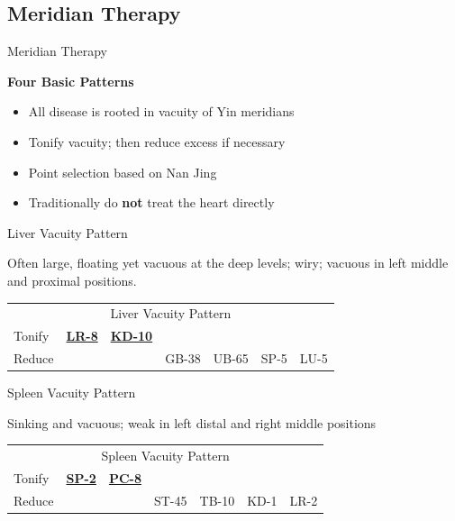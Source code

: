 \subsection{Meridian Therapy}

\begin{frame}{Meridian Therapy}

\textbf{\Large Four Basic Patterns}

\begin{itemize}\itemsep1em
\item All disease is rooted in vacuity of Yin meridians
\item Tonify vacuity; then reduce excess if necessary
\item Point selection based on Nan Jing
\item Traditionally do \textbf{not} treat the heart directly
\end{itemize}

\end{frame}

\begin{frame}{Liver Vacuity Pattern}

\begin{pulse}
Often large, floating yet vacuous at the deep levels; wiry; vacuous in left middle and proximal positions.
\end{pulse}


\begin{table}[]
\begin{tabular}{lllllll}
\multicolumn{7}{c}{Liver Vacuity Pattern}                                         \\
Tonify & {\ul \textbf{LR-8}} & {\ul \textbf{KD-10}} &       &       &      &      \\
Reduce &                     &                      & GB-38 & UB-65 & SP-5 & LU-5
\end{tabular}
\end{table}


\end{frame}

\begin{frame}{Spleen Vacuity Pattern}

\begin{pulse}
Sinking and vacuous; weak in left distal and right middle positions
\end{pulse}


\begin{table}[]
\begin{tabular}{lllllll}
\multicolumn{7}{c}{Spleen Vacuity Pattern}                                       \\
Tonify & {\ul \textbf{SP-2}} & {\ul \textbf{PC-8}} &       &       &      &      \\
Reduce &                     &                     & ST-45 & TB-10 & KD-1 & LR-2
\end{tabular}
\end{table}


\end{frame}

